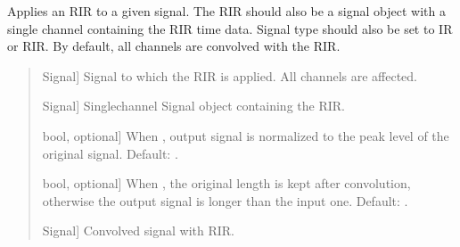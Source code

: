 \documentclass[letterpaper,10pt,english]{sphinxmanual}
\begin{document}
\begin{fulllineitems}
\label{\detokenize{modules/dsptoolbox.room_acoustics:dsptoolbox.room_acoustics.convolve_rir_on_signal}}
\pysigstartsignatures
{}
\pysigstopsignatures
\sphinxAtStartPar
Applies an RIR to a given signal. The RIR should also be a signal object
with a single channel containing the RIR time data. Signal type should
also be set to IR or RIR. By default, all channels are convolved with
the RIR.
\begin{quote}\begin{description}
\begin{description}
\sphinxlineitem{\sphinxstylestrong{signal}}{[}Signal{]}
\sphinxAtStartPar
Signal to which the RIR is applied. All channels are affected.

\sphinxlineitem{\sphinxstylestrong{rir}}{[}Signal{]}
\sphinxAtStartPar
Single\sphinxhyphen{}channel Signal object containing the RIR.

\sphinxlineitem{\sphinxstylestrong{keep\_peak\_level}}{[}bool, optional{]}
\sphinxAtStartPar
When , output signal is normalized to the peak level of
the original signal. Default: .

\sphinxlineitem{\sphinxstylestrong{keep\_length}}{[}bool, optional{]}
\sphinxAtStartPar
When , the original length is kept after convolution, otherwise
the output signal is longer than the input one. Default: .

\end{description}

\begin{description}
\sphinxlineitem{\sphinxstylestrong{new\_sig}}{[}Signal{]}
\sphinxAtStartPar
Convolved signal with RIR.

\end{description}

\end{description}\end{quote}

\end{fulllineitems}
\end{document}
